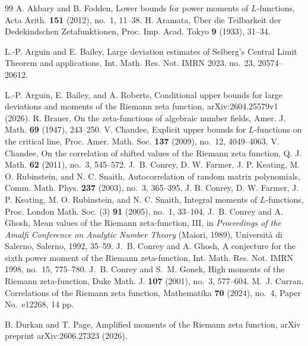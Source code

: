\documentclass[twoside,reqno,11pt,a4paper]{amsart}
\numberwithin{equation}{section}
\theoremstyle{plain}
\theoremstyle{definition}
\theoremstyle{remark}
\begin{document}
	\begin{thebibliography}{99}
		 A. Akbary and B. Fodden, Lower bounds for power moments of $L$-functions, Acta Arith. \textbf{151} (2012), no.~1, 11--38.
		 H. Aramata, {\"U}ber die Teilbarkeit der Dedekindschen Zetafunktionen, Proc. Imp. Acad. Tokyo \textbf{9} (1933), 31--34.
        
		 L.-P. Arguin and E. Bailey, Large deviation estimates of Selberg's Central Limit Theorem and applications, Int. Math. Res. Not. IMRN 2023, no.~23, 20574--20612.
        
		 L.-P. Arguin, E. Bailey, and A. Roberts, Conditional upper bounds for large deviations and moments of the Riemann zeta function, arXiv:2604.25579v1 (2026).
		 R. Brauer, On the zeta-functions of algebraic number fields, Amer. J. Math. \textbf{69} (1947), 243--250.
		 V. Chandee, Explicit upper bounds for $L$-functions on the critical line, Proc. Amer. Math. Soc. \textbf{137} (2009), no.~12, 4049--4063.
		 V. Chandee, On the correlation of shifted values of the Riemann zeta function, Q. J. Math. \textbf{62} (2011), no.~3, 545--572.
		 J.~B. Conrey, D. W. Farmer, J. P. Keating, M. O. Rubinstein, and N. C. Snaith, Autocorrelation of random matrix polynomials, Comm. Math. Phys. \textbf{237} (2003), no.~3, 365--395.
		 J. B. Conrey, D. W. Farmer, J. P. Keating, M. O. Rubinstein, and N. C. Snaith, Integral moments of $L$-functions, Proc. London Math. Soc. (3) \textbf{91} (2005), no.~1, 33--104.
         J.~B. Conrey and A. Ghosh, Mean values of the Riemann zeta-function, III, in \textit{Proceedings of the Amalfi Conference on Analytic Number Theory} (Maiori, 1989), Universit\`a di Salerno, Salerno, 1992, 35--59.  J.~B. Conrey and A. Ghosh, A conjecture for the sixth power moment of the Riemann zeta-function, Int. Math. Res. Not. IMRN 1998, no.~15, 775--780.  J.~B. Conrey and S.~M. Gonek, High moments of the Riemann zeta-function, Duke Math. J. \textbf{107} (2001), no.~3, 577--604.
		 M.~J. Curran, Correlations of the Riemann zeta function, Mathematika \textbf{70} (2024), no.~4, Paper No.\ e12268, 14 pp.
        
        		 B. Durkan and T. Page, Amplified moments of the Riemann zeta function, arXiv preprint arXiv:2606.27323 (2026).


\end{thebibliography}
\end{document}
